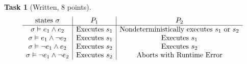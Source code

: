 \documentclass{article}
\theoremstyle{task}
\newtheorem{task}{Task}[section]
\begin{document}
\begin{task}[Written, 8 points]\
    \[
        \begin{array}{c | c | c}
            \text{states } \sigma & P_1 & P_2 \\
            \hline
            \sigma \vDash e_1 \wedge e_2 & \text{Executes } s_1 & \text{Nondeterministically executes } s_1 \text{ or } s_2 \\
            \sigma \vDash e_1 \wedge \neg e_2 & \text{Executes } s_1 & \text{Executes } s_1 \\
            \sigma \vDash \neg e_1 \wedge e_2 & \text{Executes } s_2 & \text{Executes } s_2 \\
            \sigma \vDash \neg e_1 \wedge \neg e_2 & \text{Executes } s_2 & \text{Aborts with Runtime Error} \\
        \end{array}
    \]
\end{task}
\end{document}
